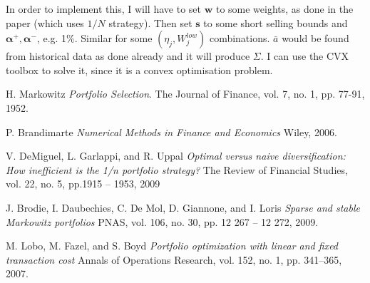 \documentclass[11pt]{article}
\begin{document}
In order to implement this, I will have to set $\bm{w}$ to some weights, as done in the paper (which uses $1/N$ strategy). Then set $\bm{s}$ to some
short selling bounds and $\bm{\alpha^+}, \bm{\alpha^-}$, e.g. 1\%. Similar for some $(\eta_j,W^{low}_j)$ combinations. $\bar{a}$ would be found from 
historical data as done already and it will produce $\Sigma$. I can use the CVX toolbox to solve it, since it is a convex optimisation problem.

\begin{thebibliography}{9}
H. Markowitz
\textit{Portfolio Selection}. 
The Journal of Finance, vol. 7, no. 1, pp. 77-91, 1952.
 
P. Brandimarte
\textit{Numerical Methods in Finance and Economics}
Wiley, 2006.
 
V. DeMiguel, L. Garlappi, and R. Uppal
\textit{Optimal versus naive diversification: How inefficient is the 1/n portfolio strategy?}
The Review of Financial Studies, vol. 22, no. 5, pp.1915 – 1953, 2009

 J. Brodie, I. Daubechies, C. De Mol, D. Giannone, and I. Loris
\textit{Sparse and stable Markowitz portfolios}
PNAS, vol. 106, no. 30, pp. 12 267 – 12 272, 2009.

 M. Lobo, M. Fazel, and S. Boyd
\textit{Portfolio optimization with linear and fixed transaction cost}
Annals of Operations Research, vol. 152, no. 1, pp. 341–365, 2007.

\end{thebibliography}
\end{document}
